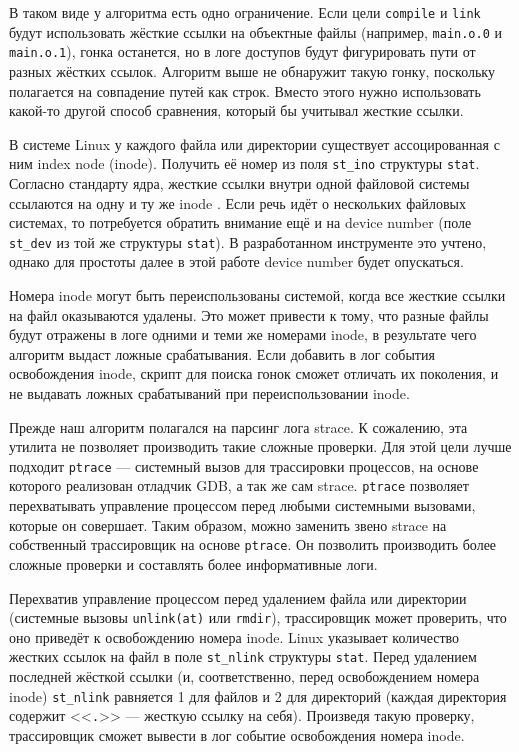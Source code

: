 В таком виде у алгоритма есть одно ограничение. Если цели \texttt{compile} и \texttt{link} будут использовать жёсткие ссылки на объектные файлы (например, \texttt{main.o.0} и \texttt{main.o.1}), гонка останется, но в логе доступов будут фигурировать пути от разных жёстких ссылок. Алгоритм выше не обнаружит такую гонку, поскольку полагается на совпадение путей как строк. Вместо этого нужно использовать какой-то другой способ сравнения, который бы учитывал жесткие ссылки.

В системе Linux у каждого файла или директории существует ассоцированная с ним index node (inode). Получить её номер из поля \texttt{st\_ino} структуры \texttt{stat}. Согласно стандарту ядра, жесткие ссылки внутри одной файловой системы ссылаются на одну и ту же inode \cite{inode-docs}. Если речь идёт о нескольких файловых системах, то потребуется обратить внимание ещё и на device number (поле \texttt{st\_dev} из той же структуры \texttt{stat}). В разработанном инструменте это учтено, однако для простоты далее в этой работе device number будет опускаться.

Номера inode могут быть переиспользованы системой, когда все жесткие ссылки на файл оказываются удалены. Это может привести к тому, что разные файлы будут отражены в логе одними и теми же номерами inode, в результате чего алгоритм выдаст ложные срабатывания. Если добавить в лог события освобождения inode, скрипт для поиска гонок сможет отличать их поколения, и не выдавать ложных срабатываний при переиспользовании inode.

Прежде наш алгоритм полагался на парсинг лога strace. К сожалению, эта утилита не позволяет производить такие сложные проверки. Для этой цели лучше подходит \texttt{ptrace} --- системный вызов для трассировки процессов, на основе которого реализован отладчик GDB, а так же сам strace. \texttt{ptrace} позволяет перехватывать управление процессом перед любыми системными вызовами, которые он совершает. Таким образом, можно заменить звено strace на собственный трассировщик на основе \texttt{ptrace}. Он позволить производить более сложные проверки и составлять более информативные логи.

Перехватив управление процессом перед удалением файла или директории (системные вызовы \texttt{unlink(at)} или \texttt{rmdir}), трассировщик может проверить, что оно приведёт к освобождению номера inode. Linux указывает количество жестких ссылок на файл в поле \texttt{st\_nlink} структуры \texttt{stat}. Перед удалением последней жёсткой ссылки (и, соответственно, перед освобождением номера inode) \texttt{st\_nlink} равняется 1 для файлов и 2 для директорий (каждая директория содержит <<\texttt{.}>> --- жесткую ссылку на себя). Произведя такую проверку, трассировщик сможет вывести в лог событие освобождения номера inode.

